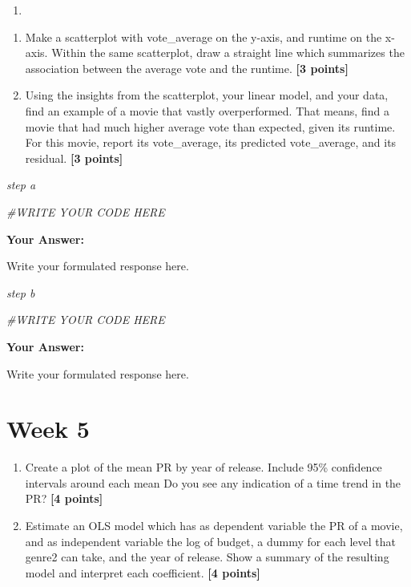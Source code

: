 \documentclass[
]{article}
\newenvironment{Shaded}{\begin{snugshade}}{\end{snugshade}}
\newcommand{\CommentTok}[1]{\textcolor[rgb]{0.56,0.35,0.01}{\textit{#1}}}
\providecommand{\tightlist}{%
  \setlength{\itemsep}{0pt}\setlength{\parskip}{0pt}}
\begin{document}
\begin{enumerate}
\def\labelenumi{\arabic{enumi}.}
\setcounter{enumi}{1}
\tightlist
\item
\end{enumerate}

\begin{enumerate}
\def\labelenumi{\alph{enumi}.}
\tightlist
\item
  Make a scatterplot with vote\_average on the y-axis, and runtime on
  the x-axis. Within the same scatterplot, draw a straight line which
  summarizes the association between the average vote and the runtime.
  \textbf{[3 points]}
\item
  Using the insights from the scatterplot, your linear model, and your
  data, find an example of a movie that vastly overperformed. That
  means, find a movie that had much higher average vote than expected,
  given its runtime. For this movie, report its vote\_average, its
  predicted vote\_average, and its residual. \textbf{[3 points]}
\end{enumerate}

\emph{step a}

\begin{Shaded}
\begin{Highlighting}[]
\CommentTok{\#WRITE YOUR CODE HERE}
\end{Highlighting}
\end{Shaded}

\textbf{Your Answer:}

Write your formulated response here.

\emph{step b}

\begin{Shaded}
\begin{Highlighting}[]
\CommentTok{\#WRITE YOUR CODE HERE}
\end{Highlighting}
\end{Shaded}

\textbf{Your Answer:}

Write your formulated response here.

\section{Week 5}\label{week-5}

\begin{enumerate}
\def\labelenumi{\alph{enumi}.}
\tightlist
\item
  Create a plot of the mean PR by year of release. Include 95\%
  confidence intervals around each mean Do you see any indication of a
  time trend in the PR? \textbf{[4 points]}
\item
  Estimate an OLS model which has as dependent variable the PR of a
  movie, and as independent variable the log of budget, a dummy for each
  level that genre2 can take, and the year of release. Show a summary of
  the resulting model and interpret each coefficient.
  \textbf{[4 points]}
\end{enumerate}
\end{document}
